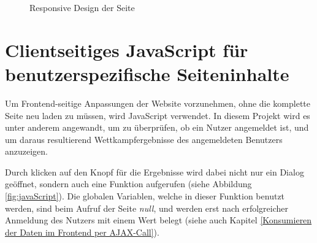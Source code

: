\begin{figure}[!h]
	\caption{Responsive Design der Seite}
	\label{fig:responsive}
\end{figure}

\section{Clientseitiges JavaScript für benutzerspezifische Seiteninhalte}
\label{Clientseitiges JavaScript}
Um Frontend-seitige Anpassungen der Website vorzunehmen, ohne die komplette Seite neu laden zu müssen, wird JavaScript verwendet. In diesem Projekt wird es unter anderem angewandt, um zu überprüfen, ob ein Nutzer angemeldet ist, und um daraus resultierend Wettkampfergebnisse des angemeldeten Benutzers anzuzeigen.
\par
Durch klicken auf den Knopf für die Ergebnisse wird dabei nicht nur ein Dialog geöffnet, sondern auch eine Funktion aufgerufen (siehe Abbildung \vref{fig:javaScript}). Die globalen Variablen, welche in dieser Funktion benutzt werden, sind beim Aufruf der Seite \textit{null}, und werden erst nach erfolgreicher Anmeldung des Nutzers mit einem Wert belegt (siehe auch Kapitel \vref{Konsumieren der Daten im Frontend per AJAX-Call}).


